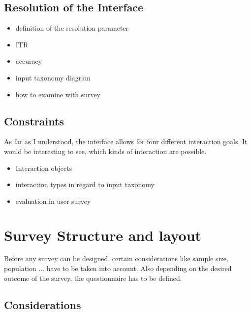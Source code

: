         \section{Resolution of the Interface}


            \begin{itemize}
                \item definition of the resolution parameter
                \item ITR
                \item accuracy
                \item input taxonomy diagram
                \item how to examine with survey                                     
            \end{itemize}

        \section{Constraints}

            As far as I understood, the interface allows for four different interaction goals. It would be interesting to see, which kinds of interaction are possible.                

            \begin{itemize}
                \item Interaction objects
                \item interaction types in regard to input taxonomy
                \item evaluation in user survey
            \end{itemize}

    \chapter{Survey Structure and layout}

        Before any survey can be designed, certain considerations like sample size, population ... 
        have to be taken into account. Also depending on the desired outcome of the survey, the questionnaire has to be defined.

        \section{Considerations}


